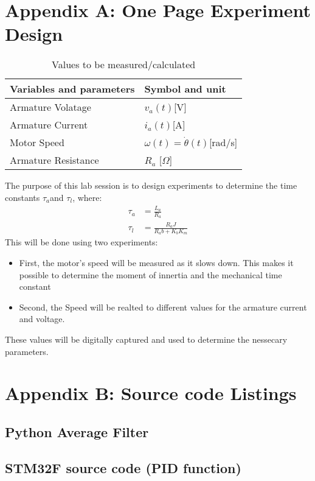 \chapter{Appendix A: One Page Experiment Design}
\label{apx:A}

\begin{table}[h]
\centering
\caption{Values to be measured/calculated}
\label{my-label}
\begin{tabular}{@{}ll@{}}
\toprule
Variables and parameters & Symbol and unit                          \\ \midrule
Armature Volatage        & $v_a(t)${[}V{]}                          \\
Armature Current         & $i_a(t)${[}A{]}                          \\
Motor Speed              & $\omega(t) = \dot{\theta}(t)${[}rad/s{]} \\
Armature Resistance      & $R_a$ {[}$\Omega${]}                     \\ \bottomrule
\end{tabular}
\end{table}

The purpose of this lab session is to design experiments to determine the time constants $\tau_a$and $\tau_l$, where:\\
\begin{align*}
\tau_a & = \frac{L_a}{R_a} \\
\tau_l & = \frac{R_aJ}{R_ab+K_bK_m} 
\end{align*}
This will be done using two experiments:
\begin{itemize}
	\item First, the motor's speed will be measured as it slows down. This makes it possible to determine the moment of innertia and the mechanical time constant
	\item Second, the Speed will be realted to different values for the armature current and voltage.
\end{itemize}
These values will be digitally captured and used to determine the nessecary parameters.

\chapter{Appendix B: Source code Listings}
\label{apx:B}
\section{Python Average Filter}


\section{STM32F source code (PID function)}

